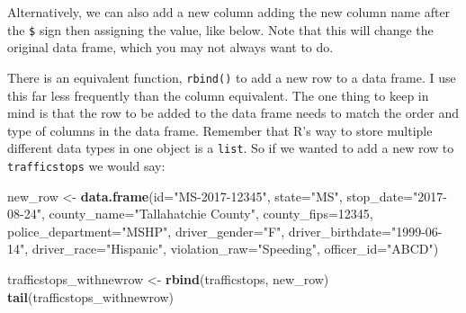 \documentclass[]{book}
\newenvironment{Shaded}{\begin{snugshade}}{\end{snugshade}}
\newcommand{\KeywordTok}[1]{\textcolor[rgb]{0.13,0.29,0.53}{\textbf{{#1}}}}
\newcommand{\DataTypeTok}[1]{\textcolor[rgb]{0.13,0.29,0.53}{{#1}}}
\newcommand{\DecValTok}[1]{\textcolor[rgb]{0.00,0.00,0.81}{{#1}}}
\newcommand{\StringTok}[1]{\textcolor[rgb]{0.31,0.60,0.02}{{#1}}}
\newcommand{\CommentTok}[1]{\textcolor[rgb]{0.56,0.35,0.01}{\textit{{#1}}}}
\newcommand{\OtherTok}[1]{\textcolor[rgb]{0.56,0.35,0.01}{{#1}}}
\newcommand{\NormalTok}[1]{{#1}}
\theoremstyle{definition}
\theoremstyle{definition}
\theoremstyle{remark}
\begin{document}
Alternatively, we can also add a new column adding the new column name
after the \texttt{\$} sign then assigning the value, like below. Note
that this will change the original data frame, which you may not always
want to do.

\begin{Shaded}
\end{Shaded}

There is an equivalent function, \texttt{rbind()} to add a new row to a
data frame. I use this far less frequently than the column equivalent.
The one thing to keep in mind is that the row to be added to the data
frame needs to match the order and type of columns in the data frame.
Remember that R's way to store multiple different data types in one
object is a \texttt{list}. So if we wanted to add a new row to
\texttt{trafficstops} we would say:

\begin{Shaded}
\begin{Highlighting}[]
\NormalTok{new_row <-}\StringTok{ }\KeywordTok{data.frame}\NormalTok{(}\DataTypeTok{id=}\StringTok{"MS-2017-12345"}\NormalTok{, }\DataTypeTok{state=}\StringTok{"MS"}\NormalTok{, }\DataTypeTok{stop_date=}\StringTok{"2017-08-24"}\NormalTok{,}
                \DataTypeTok{county_name=}\StringTok{"Tallahatchie County"}\NormalTok{, }\DataTypeTok{county_fips=}\DecValTok{12345}\NormalTok{,}
                \DataTypeTok{police_department=}\StringTok{"MSHP"}\NormalTok{, }\DataTypeTok{driver_gender=}\StringTok{"F"}\NormalTok{, }\DataTypeTok{driver_birthdate=}\StringTok{"1999-06-14"}\NormalTok{,}
                \DataTypeTok{driver_race=}\StringTok{"Hispanic"}\NormalTok{, }\DataTypeTok{violation_raw=}\StringTok{"Speeding"}\NormalTok{, }\DataTypeTok{officer_id=}\StringTok{"ABCD"}\NormalTok{)}

\NormalTok{trafficstops_withnewrow <-}\StringTok{ }\KeywordTok{rbind}\NormalTok{(trafficstops, new_row)}
\KeywordTok{tail}\NormalTok{(trafficstops_withnewrow)}
\end{Highlighting}
\end{Shaded}
\end{document}
